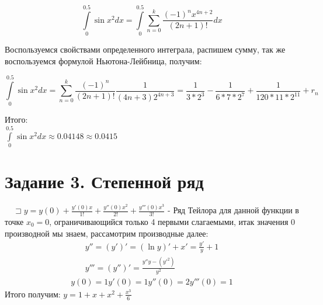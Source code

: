 \documentclass{article}
\begin{document}
\begin{equation}
    \int\limits_{0}^{0.5}\sin{x^2}dx = \int\limits_{0}^{0.5}\sum_{n=0}^{k}\frac{(-1)^{n}x^{4n+2}}{(2n+1)!}dx
\end{equation}

Воспользуемся свойствами определенного интеграла, распишем сумму, так же воспользуемся формулой Ньютона-Лейбница, получим:

\begin{equation}
    \int\limits_{0}^{0.5}\sin{x^2}dx = \sum_{n=0}^{k}\frac{(-1)^n}{(2n+1)!}\frac{1}{(4n + 3)2^{4n+3}} = \frac{1}{3*2^3} - \frac{1}{6 * 7 * 2^7} + \frac{1}{120 * 11 * 2^{11}} + r_n 
\end{equation}

Итого: 
\\
$\int\limits_{0}^{0.5}\sin{x^2}dx \approx 0.04148 \approx 0.0415$

\section{Задание 3. Степенной ряд}

$\quad\sqsupset y = y(0) + \frac{y'(0)x}{1!} + \frac{y''(0)x^2}{2!} + \frac{y'''(0)x^3}{3!}$ - Ряд Тейлора для данной функции в точке $x_0 = 0$, ограничивающийся только 4 первыми слагаемыми, итак значения 0 производной мы знаем, рассамотрим производные далее:
\begin{align}
    y'' = (y')' = (\ln{y})' + x' = \frac{y'}{y} + 1\\
    y''' = (y'')' = \frac{y''y - (y'^2)}{y^2}
\end{align}
\begin{align}    
    y(0) = 1
    y'(0) = 1
    y''(0) = 2
    y'''(0) = 1
\end{align}
Итого получим:
$y = 1 + x + x^2 + \frac{x^3}{6}$
\end{document}
